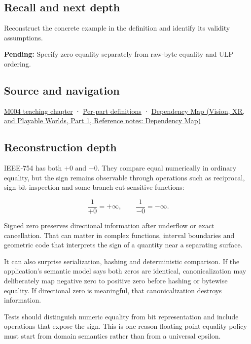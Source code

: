 \subsection{Recall and next depth}\label{appendix-3a048f032c1f-recall-and-next-depth}

\hypertarget{appendix-3a048f032c1f-recall-and-next-depth}{}

Reconstruct the concrete example in the definition and identify its validity assumptions.

\textbf{Pending:} Specify zero equality separately from raw-byte equality and ULP ordering.

\subsection{Source and navigation}\label{appendix-3a048f032c1f-source-and-navigation}

\hypertarget{appendix-3a048f032c1f-source-and-navigation}{}

\hyperref[01-foundations-i-ch001-a-stretching-ruler-for-real-valued-quantities]{M004 teaching chapter} · \hyperref[appendix-fd090d982a15-m004---parts-61-76]{Per-part definitions} · \href{../07-Vision-XR-and-Playable-Worlds-P01/main.pdf\#nameddest=appendix-4ad47bdd269a}{Dependency Map (Vision, XR, and Playable Worlds, Part 1, Reference notes: Dependency Map)}

\subsection{Reconstruction depth}\label{appendix-3a048f032c1f-reconstruction-depth}

\hypertarget{appendix-3a048f032c1f-reconstruction-depth}{}

IEEE-754 has both \(+0\) and \(-0\). They compare equal numerically in ordinary equality, but the sign remains observable through operations such as reciprocal, sign-bit inspection and some branch-cut-sensitive functions:

\[
\frac{1}{+0}=+\infty,
\qquad
\frac{1}{-0}=-\infty.
\]

Signed zero preserves directional information after underflow or exact cancellation. That can matter in complex functions, interval boundaries and geometric code that interprets the sign of a quantity near a separating surface.

It can also surprise serialization, hashing and deterministic comparison. If the application's semantic model says both zeros are identical, canonicalization may deliberately map negative zero to positive zero before hashing or bytewise equality. If directional zero is meaningful, that canonicalization destroys information.

Tests should distinguish numeric equality from bit representation and include operations that expose the sign. This is one reason floating-point equality policy must start from domain semantics rather than from a universal epsilon.
